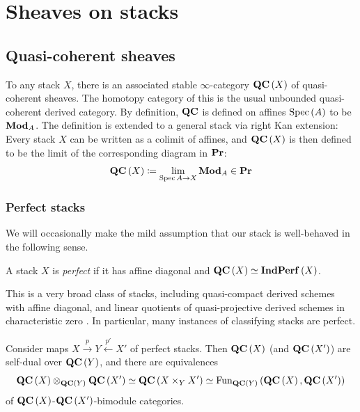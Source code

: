 \section{Sheaves on stacks}
\label{sec:sheaves}

\subsection{Quasi-coherent sheaves}
\label{sec:QC}

To any stack $X$, there is an associated stable $\infty$-category $\mathbf{QC}\left(X\right)$ of
quasi-coherent sheaves.
The homotopy category of this is the usual unbounded quasi-coherent derived category.
By definition, $\mathbf{QC}$ is defined on affines $\operatorname{Spec}\left(A\right)$ to be $\mathbf{Mod}_A$.
The definition is extended to a general stack via right Kan extension:
Every stack $X$ can be written as a colimit of affines, and $\mathbf{QC}\left(X\right)$ is then
defined to be the limit of the corresponding diagram in $\mathbf{Pr}$:
\begin{equation*}
\mathbf{QC}\left(X\right)\coloneqq \lim_{\operatorname{Spec} A \to X} \mathbf{Mod}_A \in \mathbf{Pr}
\end{equation*}

\subsubsection{Perfect stacks}

We will occasionally make the mild assumption that our stack is well-behaved in the
following sense.

\begin{defn}
\label{defn:perfect}
A stack $X$ is \emph{perfect}
if it has affine diagonal and
$\mathbf{QC}\left(X\right)\simeq \mathbf{Ind}\mathbf{Perf}\left(X\right)$.
\end{defn}

This is a very broad class of stacks, including quasi-compact derived schemes with affine
diagonal, and linear quotients of quasi-projective derived schemes in characteristic zero
\cite[\S 3.3]{BZFN}. In particular, many instances of classifying stacks are perfect.

\begin{theorem}
\label{thm:BZFN}
Consider maps $X\xrightarrow{p} Y \xleftarrow{p'} X'$ of perfect stacks.
Then $\mathbf{QC}\left(X\right)$ (and $\mathbf{QC}\left(X'\right)$) are self-dual over
$\mathbf{QC}\left(Y\right)$, and there are equivalences
\begin{equation*}
\mathbf{QC}\left(X\right) \otimes_{\mathbf{QC}\left(Y\right)} \mathbf{QC}\left(X'\right) \simeq
\mathbf{QC}\left(X\times _Y X'\right) \simeq
\operatorname{Fun}_{\mathbf{QC}\left(Y\right)}\left(\mathbf{QC}\left(X\right) , \mathbf{QC}\left(X'\right)\right)
\end{equation*}
of $\mathbf{QC}\left(X\right)$-$\mathbf{QC}\left(X'\right)$-bimodule categories.
\end{theorem}

